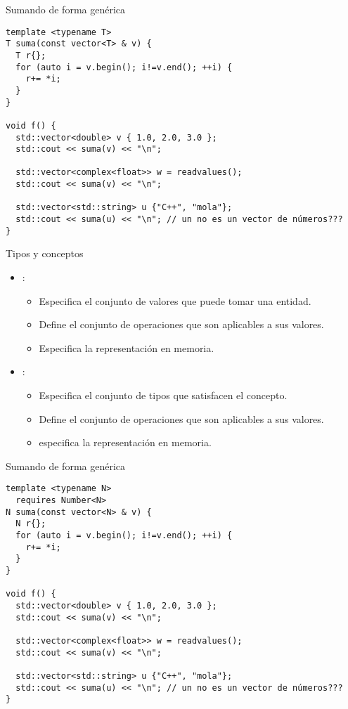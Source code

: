 \begin{frame}[t,fragile]
\begin{block}{Sumando de forma genérica}
\begin{lstlisting}
template <typename T>
T suma(const vector<T> & v) {
  T r{};
  for (auto i = v.begin(); i!=v.end(); ++i) {
    r+= *i;
  }
}

void f() {
  std::vector<double> v { 1.0, 2.0, 3.0 };
  std::cout << suma(v) << "\n";

  std::vector<complex<float>> w = readvalues();
  std::cout << suma(v) << "\n";

  std::vector<std::string> u {"C++", "mola"};
  std::cout << suma(u) << "\n"; // un no es un vector de números???
}
\end{lstlisting}
\end{block}
\end{frame}

\begin{frame}[t]{Tipos y conceptos}
\begin{itemize}
  \item {}:
    \begin{itemize}
      \item Especifica el conjunto de valores que puede tomar una entidad.
      \item Define el conjunto de operaciones que son aplicables a sus valores.
      \item Especifica la representación en memoria.
    \end{itemize}

  \vfill\pause
  \item {}:
    \begin{itemize}
      \item Especifica el conjunto de tipos que satisfacen el concepto.
      \item Define el conjunto de operaciones que son aplicables a sus valores.
      \item {} especifica la representación en memoria.
    \end{itemize}
\end{itemize}
\end{frame}

\begin{frame}[t,fragile]
\begin{block}{Sumando de forma genérica}
\begin{lstlisting}
template <typename N>
  requires Number<N>
N suma(const vector<N> & v) {
  N r{};
  for (auto i = v.begin(); i!=v.end(); ++i) {
    r+= *i;
  }
}

void f() {
  std::vector<double> v { 1.0, 2.0, 3.0 };
  std::cout << suma(v) << "\n";

  std::vector<complex<float>> w = readvalues();
  std::cout << suma(v) << "\n";

  std::vector<std::string> u {"C++", "mola"};
  std::cout << suma(u) << "\n"; // un no es un vector de números???
}
\end{lstlisting}
\end{block}
\end{frame}

